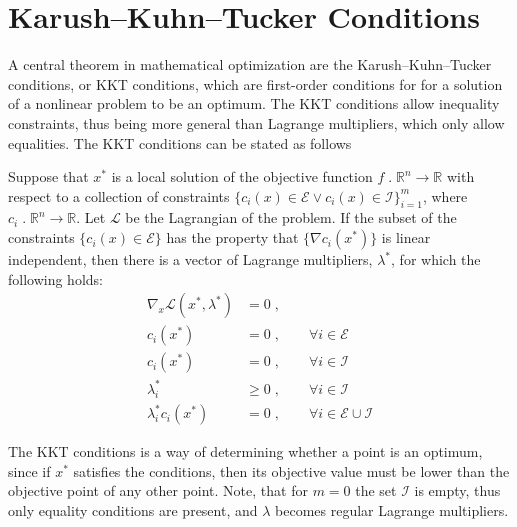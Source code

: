 \section{Karush–Kuhn–Tucker Conditions}
A central theorem in mathematical optimization are the Karush–Kuhn–Tucker conditions, or KKT conditions, which are first-order conditions for for a solution of a nonlinear problem to be an optimum. The KKT conditions allow inequality constraints, thus being more general than Lagrange multipliers, which only allow equalities. The KKT conditions can be stated as follows \cite{wright}
\begin{theorem}
	Suppose that $x^*$ is a local solution of the objective function $f \; . \; \mathbb{R}^n \to \mathbb{R}$ with respect to a collection of constraints $\{ c_i(x) \in \mathcal{E} \vee c_i(x) \in \mathcal{I} \}_{i=1}^{m}$, where $c_i \; . \; \mathbb{R}^n \to \mathbb{R}$. Let $\mathcal{L}$ be the Lagrangian of the problem. If the subset of the constraints $\{ c_i(x) \in \mathcal{E}\}$ has the property that $\{ \nabla c_i(x^*)\}$ is linear independent, then there is a vector of Lagrange multipliers, $\lambda^*$, for which the following holds:
	\begin{subequations}	
	\begin{align}
		\nabla_x \mathcal{L}(x^*,\lambda^*) &= 0 \; ,  \\
		c_i(x^*) &= 0 \; , \qquad \forall i \in \mathcal{E} \\
		c_i(x^*) &= 0 \; , \qquad \forall i \in \mathcal{I} \\
		\lambda_{i}^* &\geq 0 \; , \qquad \forall i \in \mathcal{I} \\
		\lambda_{i}^* c_i(x^*) &= 0 \; , \qquad \forall i \in \mathcal{E} \cup \mathcal{I}
	\end{align}
	\end{subequations}	  
\end{theorem}
The KKT conditions is a way of determining whether a point is an optimum, since if $x^*$ satisfies the conditions, then its objective value must be lower than the objective point of any other point.
Note, that for $m = 0$ the set $\mathcal{I}$ is empty, thus only equality conditions are present, and $\lambda$ becomes regular Lagrange multipliers. 

